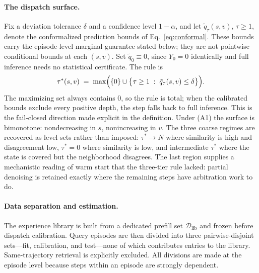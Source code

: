 \documentclass{article}
\begin{document}
\paragraph{The dispatch surface.}
Fix a deviation tolerance $\delta$ and a confidence level $1-\alpha$, and let
$\tilde{q}_\tau(s,v)$, $\tau \ge 1$, denote the conformalized prediction
bounds of Eq.~\ref{eq:conformal}. These bounds carry the episode-level
marginal guarantee stated below; they are not pointwise conditional bounds at
each $(s,v)$. Set $\tilde{q}_0 \equiv 0$, since $Y_0 = 0$ identically and full
inference needs no statistical certificate. The rule is
\begin{equation}
\tau^{*}(s, v) \;=\;
\max \Bigl( \{0\} \cup \bigl\{ \tau \ge 1 \;:\; \tilde{q}_\tau(s, v) \le \delta \bigr\} \Bigr).
\label{eq:tau}
\end{equation}
The maximizing set always contains $0$, so the rule is total; when the
calibrated bounds exclude every positive depth, the step falls back to full
inference. This is the fail-closed direction made explicit in the
definition. Under (A1) the surface is bimonotone: nondecreasing in $s$,
nonincreasing in $v$. The three coarse regimes are recovered as level sets
rather than imposed: $\tau^{*} \to N$ where similarity is high and
disagreement low, $\tau^{*} = 0$ where similarity is low, and intermediate
$\tau^{*}$ where the state is covered but the neighborhood disagrees. The
last region supplies a mechanistic reading of warm start that the three-tier
rule lacked: partial denoising is retained exactly where the remaining steps
have arbitration work to do.

\paragraph{Data separation and estimation.}
The experience library is built from a dedicated prefill set
$\mathcal{D}_{\mathrm{lib}}$ and frozen before dispatch calibration. Query
episodes are then divided into three pairwise-disjoint sets---fit,
calibration, and test---none of which contributes entries to the library.
Same-trajectory retrieval is explicitly excluded. All divisions are made at
the episode level because steps within an episode are strongly dependent.
\end{document}
